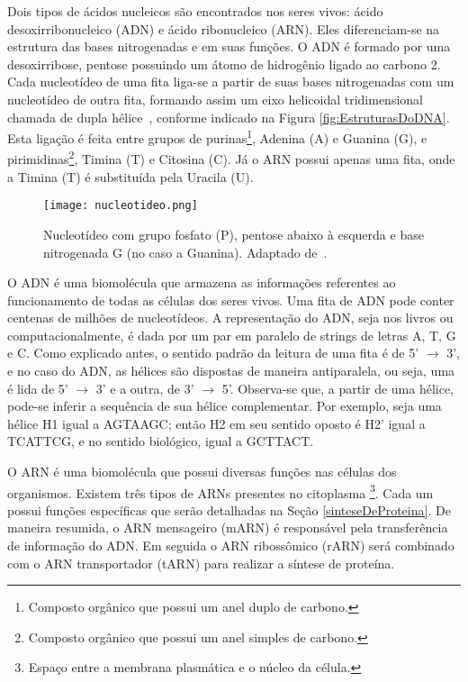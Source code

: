\indent Dois tipos de ácidos nucleicos são encontrados nos seres vivos: ácido desoxirribonucleico (ADN) e ácido ribonucleico (ARN). Eles diferenciam-se na estrutura das bases nitrogenadas e em suas funções. O ADN é formado por uma desoxirribose, pentose possuindo um átomo de hidrogênio ligado ao carbono 2. Cada nucleotídeo de uma fita liga-se a partir de suas bases nitrogenadas com um nucleotídeo de outra fita, formando assim um eixo helicoidal tridimensional chamada de dupla hélice~\cite{setubal97}, conforme indicado na Figura \ref{fig:EstruturasDoDNA}. Esta ligação é feita entre grupos de purinas\footnote{Composto orgânico que possui um anel duplo de carbono.}, Adenina (A) e Guanina (G), e pirimidinas\footnote{Composto orgânico que possui um anel simples de carbono.}, Timina (T) e Citosina (C). Já o ARN possui apenas uma fita, onde a Timina (T) é substituída pela Uracila (U).

\begin{figure}[h]
    \centering
    \texttt{[image: nucleotideo.png]}
    \caption{Nucleotídeo com grupo fosfato (P), pentose abaixo à esquerda e base nitrogenada G (no caso a Guanina). Adaptado de~\cite{dnadiscovery08}. }
    \label{fig:Nucleotideo}
\end{figure} 

\indent O ADN é uma biomolécula que armazena as informações referentes ao funcionamento de todas as células dos seres vivos. Uma fita de ADN pode conter centenas de milhões de nucleotídeos. A representação do ADN, seja nos livros ou computacionalmente, é dada por um par em paralelo de strings de letras A, T, G e C. Como explicado antes, o sentido padrão da leitura de uma fita é de 5' $\rightarrow$ 3', e no caso do ADN, as hélices são dispostas de maneira antiparalela, ou seja, uma é lida de 5' $\rightarrow$ 3' e a outra, de 3' $\rightarrow$ 5'. Observa-se que, a partir de uma hélice, pode-se inferir a sequência de sua hélice complementar. Por exemplo, seja uma hélice H1 igual a AGTAAGC; então H2 em seu sentido oposto é H2' igual a TCATTCG, e no sentido biológico, igual a GCTTACT.

\indent O ARN é uma biomolécula que possui diversas funções nas células dos organismos. Existem três tipos de ARNs presentes no citoplasma \footnote{Espaço entre a membrana plasmática e o núcleo da célula.}. Cada um possui funções específicas que serão detalhadas na Seção \ref{sinteseDeProteina}. De maneira resumida, o ARN mensageiro (mARN) é responsável pela transferência de informação do ADN. Em seguida o ARN ribossômico (rARN) será combinado com o ARN transportador (tARN) para realizar a síntese de proteína.


